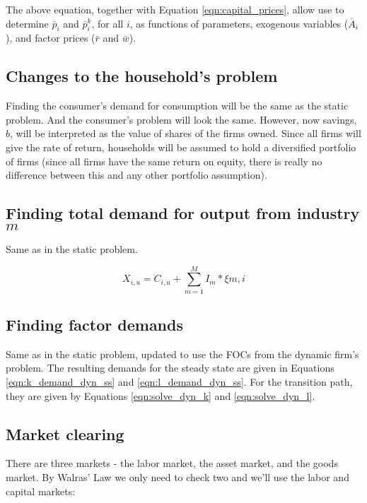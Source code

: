 \documentclass[letterpaper,12pt]{article}
\theoremstyle{definition}
\begin{document}
\begin{spacing}{1.5}
The above equation, together with Equation \ref{eqn:capital_prices}, allow use to determine $\bar{p}_{i}$ and $\bar{p}^{k}_{i}$, for all $i$, as functions of parameters, exogenous variables ($\bar{A}_{i}$), and factor prices ($\bar{r}$ and $\bar{w}$).


\subsection*{Changes to the household's problem}

Finding the consumer's demand for consumption will be the same as the static problem.  And the consumer's problem will look the same.  However, now savings, $b$, will be interpreted as the value of shares of the firms owned.  Since all firms will give the rate of return, households will be assumed to hold a diversified portfolio of firms (since all firms have the same return on equity, there is really no difference between this and any other portfolio assumption).  

\subsection*{Finding total demand for output from industry $m$}

Same as in the static problem.

\begin{equation}
\label{eqn:output_demand_dyn}
X_{i,u} = C_{i,u} + \sum_{m=1}^{M}I_{m}*\xi{m,i}
\end{equation}

\subsection*{Finding factor demands}

Same as in the static problem, updated to use the FOCs from the dynamic firm's problem.  The resulting demands for the steady state are given in Equations \ref{eqn:k_demand_dyn_ss} and \ref{eqn:l_demand_dyn_ss}.  For the transition path, they are given by Equations \ref{eqn:solve_dyn_k} and \ref{eqn:solve_dyn_l}.


\subsection*{Market clearing}

There are three markets - the labor market, the asset market, and the goods market.  By Walras' Law we only need to check two and we'll use the labor and capital markets:


\end{spacing}
\end{document}
